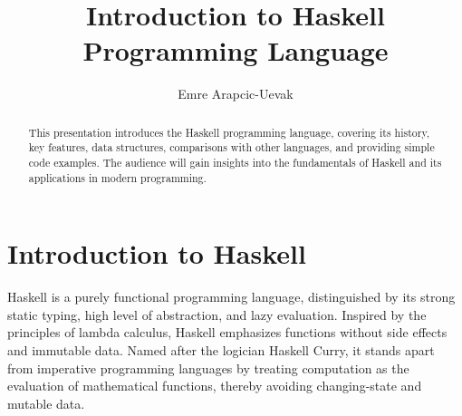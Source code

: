 \documentclass[a4paper, 10pt]{article}
\title{Introduction to Haskell Programming Language}
\author{Emre Arapcic-Uevak}
\date{}
\begin{document}
	\maketitle
    \lstset{language=Haskell}
	\vspace{5mm}
	
	\begin{abstract}
		\begin{center}
			This presentation introduces the Haskell programming language, covering its history, key features, data structures, comparisons with other languages, and providing simple code examples. The audience will gain insights into the fundamentals of Haskell and its applications in modern programming.
		\end{center}
	\end{abstract}


	\newpage %

	\tableofcontents
	\pagebreak

	\section{Introduction to Haskell}
        \noindent Haskell is a purely functional programming language, distinguished by its strong static typing, high level of abstraction, and lazy evaluation. Inspired by the principles of lambda calculus, Haskell emphasizes functions without side effects and immutable data. Named after the logician Haskell Curry, it stands apart from imperative programming languages by treating computation as the evaluation of mathematical functions, thereby avoiding changing-state and mutable data.
\end{document}
